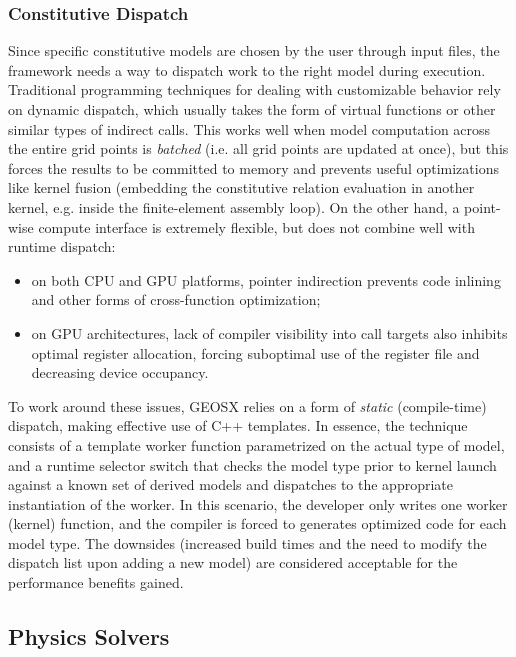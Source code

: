 \subsubsection{Constitutive Dispatch}

Since specific constitutive models are chosen by the user through input files, the framework needs a way to dispatch work to the right model during execution.   Traditional programming techniques for dealing with customizable behavior rely on dynamic dispatch, which usually takes the form of virtual functions or other similar types of indirect calls.   This works well when model computation across the entire grid points is \textit{batched} (i.e. all grid points are updated at once), but this forces the results to be committed to memory and prevents useful optimizations like kernel fusion (embedding the constitutive relation evaluation in another kernel, e.g. inside the finite-element assembly loop).   On the other hand, a point-wise compute interface is extremely flexible, but does not combine well with runtime dispatch:
\begin{itemize}
    \item on both CPU and GPU platforms, pointer indirection prevents code inlining and other forms of cross-function optimization;
    \item on GPU architectures, lack of compiler visibility into call targets also inhibits optimal register allocation, forcing suboptimal use of the register file and decreasing device occupancy.
\end{itemize}
To work around these issues, GEOSX relies on a form of \textit{static} (compile-time) dispatch, making effective use of C++ templates.   In essence, the technique consists of a template worker function parametrized on the actual type of model, and a runtime selector switch that checks the model type prior to kernel launch against a known set of derived models and dispatches to the appropriate instantiation of the worker.   In this scenario, the developer only writes one worker (kernel) function, and the compiler is forced to generates optimized code for each model type.   The downsides (increased build times and the need to modify the dispatch list upon adding a new model) are considered acceptable for the performance benefits gained.

\subsection{Physics Solvers}

